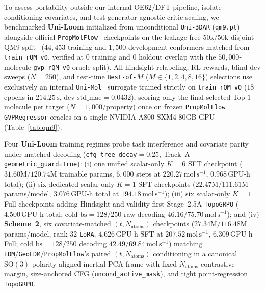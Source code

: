 \documentclass[11pt,a4paper]{article}
\begin{document}
To assess portability outside our internal OE62/DFT pipeline, isolate conditioning covariates, and test generator-agnostic critic scaling, we benchmarked \textbf{Uni-Loom} initialized from unconditional \texttt{Uni-3DAR} (\texttt{qm9.pt})~\cite{lu2025uni3dar} alongside official \texttt{PropMolFlow}~\cite{zeng2026propmolflow} checkpoints on the leakage-free $50\text{k}/50\text{k}$ disjoint QM9 split~\cite{ramakrishnan2014qm9,zeng2026propmolflow} ($44{,}453$ training and $1{,}500$ development conformers matched from \texttt{train\_rQM\_v0}, verified at $0$ training and $0$ holdout overlap with the $50{,}000$-molecule \texttt{gvp\_rQM\_v0} oracle split). All hindsight relabeling, RL rewards, blind dev sweeps ($N=250$), and test-time \texttt{Best-of-$M$} ($M\in\{1,2,4,8,16\}$) selections use exclusively an internal \texttt{Uni-Mol}~\cite{zhou2023unimol} surrogate trained strictly on \texttt{train\_rQM\_v0} ($18$ epochs in $214.25\,\text{s}$, dev $\text{std\_mae}=0.0432$), scoring only the final selected Top-$1$ molecule per target ($N=1{,}000$/property) once on frozen \texttt{PropMolFlow} \texttt{GVPRegressor} oracles on a single NVIDIA A800-SXM4-80GB GPU (Table~\ref{tab:qm9}).

Four \textbf{Uni-Loom} training regimes probe task interference and covariate parity under matched decoding (\texttt{cfg\_tree\_decay}$=0.25$, Track~A \texttt{geometric\_guard=True}): (i) one unified scalar-only $K=6$ SFT checkpoint ($31.60\text{M}/120.74\text{M}$ trainable params, $6{,}000$ steps at $220.27\,\text{mol}\,\text{s}^{-1}$, $0.968\,\text{GPU-h}$ total); (ii) six dedicated scalar-only $K=1$ SFT checkpoints ($22.47\text{M}/111.61\text{M}$ params/model, $3.076\,\text{GPU-h}$ total at $194.18\,\text{mol}\,\text{s}^{-1}$); (iii) six scalar-only $K=1$ Full checkpoints adding Hindsight and validity-first Stage~2.5A \texttt{TopoGRPO} ($4.500\,\text{GPU-h}$ total; cold $\text{bs}=128/250$ raw decoding $46.16/75.70\,\text{mol}\,\text{s}^{-1}$); and (iv) \textbf{Scheme~2}, six covariate-matched $(t, N_{\text{atoms}})$ checkpoints ($27.34\text{M}/116.48\text{M}$ params/model, rank-$32$ \texttt{LoRA}, $4.626\,\text{GPU-h}$ SFT at $207.52\,\text{mol}\,\text{s}^{-1}$, $6.309\,\text{GPU-h}$ Full; cold $\text{bs}=128/250$ decoding $42.49/69.84\,\text{mol}\,\text{s}^{-1}$) matching \texttt{EDM}/\texttt{GeoLDM}/\texttt{PropMolFlow}'s paired $(t, N_{\text{atoms}})$ conditioning in a canonical $\text{SO}(3)$ polarity-aligned inertial PCA frame with fixed-$N_{\text{atoms}}$ contrastive margin, size-anchored CFG (\texttt{uncond\_active\_mask}), and tight point-regression \texttt{TopoGRPO}.
\end{document}
